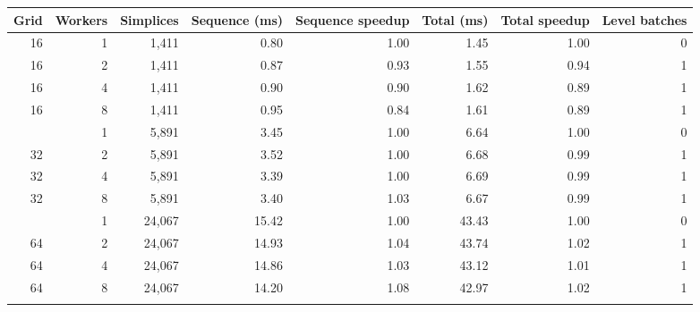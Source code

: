 \begin{tabular}{rrrrrrrr}
\toprule
Grid & Workers & Simplices & Sequence (ms) & Sequence speedup & Total (ms) & Total speedup & Level batches \\
\midrule
16 & 1 & 1,411 & 0.80 & 1.00 & 1.45 & 1.00 & 0 \\
16 & 2 & 1,411 & 0.87 & 0.93 & 1.55 & 0.94 & 1 \\
16 & 4 & 1,411 & 0.90 & 0.90 & 1.62 & 0.89 & 1 \\
16 & 8 & 1,411 & 0.95 & 0.84 & 1.61 & 0.89 & 1 \\
\addlinespace
32 & 1 & 5,891 & 3.45 & 1.00 & 6.64 & 1.00 & 0 \\
32 & 2 & 5,891 & 3.52 & 1.00 & 6.68 & 0.99 & 1 \\
32 & 4 & 5,891 & 3.39 & 1.00 & 6.69 & 0.99 & 1 \\
32 & 8 & 5,891 & 3.40 & 1.03 & 6.67 & 0.99 & 1 \\
\addlinespace
64 & 1 & 24,067 & 15.42 & 1.00 & 43.43 & 1.00 & 0 \\
64 & 2 & 24,067 & 14.93 & 1.04 & 43.74 & 1.02 & 1 \\
64 & 4 & 24,067 & 14.86 & 1.03 & 43.12 & 1.01 & 1 \\
64 & 8 & 24,067 & 14.20 & 1.08 & 42.97 & 1.02 & 1 \\
\addlinespace
\bottomrule
\end{tabular}

